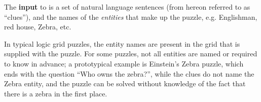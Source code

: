 
The \textbf{input} to \ourtool is a set of natural language sentences (from hereon referred to as ``clues''), and the names of the \textit{entities} that make up the puzzle, e.g. Englishman, red house, Zebra, etc. %

In typical logic grid puzzles, the entity names are present in the grid that is supplied with the puzzle. For some puzzles, not all entities are named or required to know in advance; a prototypical example is Einstein's Zebra puzzle, which ends with the question ``Who owns the zebra?'', while the clues do not name the Zebra entity, and the puzzle can be solved without knowledge of the fact that there is a zebra in the first place. 

%





